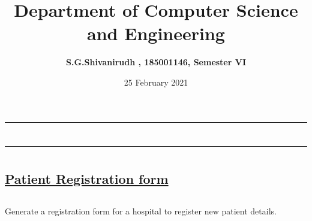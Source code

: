 \documentclass[12pt,letterpaper]{article}
\title{\textbf{Department of Computer Science and Engineering}}
\author{\textbf{S.G.Shivanirudh , 185001146, Semester VI }}
\date{25 February 2021}
\begin{document}
\maketitle
\hrule
\section*{}
\hrule 
\bigskip\bigskip

\section*{}

\subsection*{\underline{\textbf{Patient Registration form}}}
\subsection*{}
\begin{flushleft}
    Generate a registration form for a hospital to register new patient details.
\end{flushleft}

\subsection*{}
\subsubsection*{}
\begin{flushleft}

\end{flushleft}

\subsubsection*{{}}
\begin{flushleft}
    
\end{flushleft}

\subsubsection*{{}}
\begin{flushleft}
    
\end{flushleft}
\end{document}
